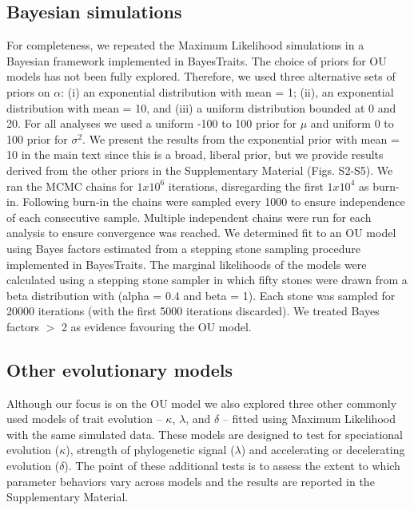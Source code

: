 \documentclass[a4paper,12pt]{article}
\begin{document}
  \subsection{Bayesian simulations} %
    For completeness, we repeated the Maximum Likelihood simulations in a Bayesian framework implemented in BayesTraits. 
    The choice of priors for OU models has not been fully explored. 
    Therefore, we used three alternative sets of priors on $\alpha$: (i) an exponential distribution with mean = 1; (ii), an exponential distribution with mean = 10, and (iii) a uniform distribution bounded at 0 and 20. 
    For all analyses we used a uniform -100 to 100 prior for $\mu$ and uniform 0 to 100 prior for $\sigma^2$. 
    We present the results from the exponential prior with mean = 10 in the main text since this is a broad, liberal prior, but we provide results derived from the other priors in the Supplementary Material (Figs. S2-S5). %
    We ran the MCMC chains for $1x10^6$ iterations, disregarding the first $1x10^4$ as burn-in. 
    Following burn-in the chains were sampled every 1000 to ensure independence of each consecutive sample. 
    Multiple independent chains were run for each analysis to ensure convergence was reached. 
    We determined fit to an OU model using Bayes factors estimated from a stepping stone sampling procedure \citep{xie2010improving}implemented in BayesTraits. 
    The marginal likelihoods of the models were calculated using a stepping stone sampler in which fifty stones were drawn from a beta distribution with (alpha = 0.4 and beta = 1). 
    Each stone was sampled for 20000 iterations (with the first 5000 iterations discarded). 
    We treated Bayes factors $>$ 2 as evidence favouring the OU model. 

  \subsection{Other evolutionary models}
    Although our focus is on the OU model we also explored three other commonly used models of trait evolution -- $\kappa$, $\lambda$, and $\delta$ \citep{Pagel:1997aa,Pagel:1999aa} -- fitted using Maximum Likelihood with the same simulated data. 
    These models are designed to test for speciational evolution ($\kappa$), strength of phylogenetic signal ($\lambda$) and accelerating or decelerating evolution ($\delta$). 
    The point of these additional tests is to assess the extent to which parameter behaviors vary across models and the results are reported in the Supplementary Material. 
\end{document}

